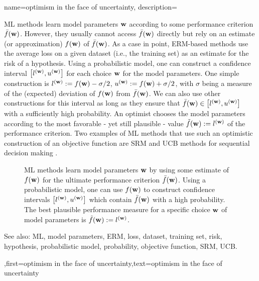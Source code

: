 {name={optimism in the face of uncertainty},
	description={ML methods learn model parameters ${\bf w}$ 
		according to some performance criterion $\bar{f}({\bf w})$. However, they usually 
		cannot access $\bar{f}({\bf w})$ directly but rely on an estimate (or approximation) 
		$f({\bf w})$ of $\bar{f}({\bf w})$. As a case in point, ERM-based methods use 
		the average loss on a given dataset (i.e., the training set) as an estimate 
		for the risk of a hypothesis. Using a probabilistic model, one can construct 
		a confidence interval 
	$\big[ l^{({\bf w})},  u^{({\bf w})} \big]$ for each choice ${\bf w}$ for the model parameters.
		One simple construction is $l^{({\bf w})} := f({\bf w}) - \sigma/2$, $u^{({\bf w})} := f({\bf w})+ \sigma/2$, 
	    with $\sigma$ being a measure of the (expected) deviation of $f({\bf w})$ from $\bar{f}({\bf w})$.
	We can also use other constructions for this interval as long as they ensure that $\bar{f}({\bf w}) \in\big[ l^{({\bf w})},  u^{({\bf w})} \big]$ 
	with a sufficiently high probability. An optimist chooses the model parameters 
	according to the most favorable - yet still plausible - value $\tilde{f}({\bf w}) :=  l^{({\bf w})}$ 
	of the performance criterion. Two examples of ML methods that use such an optimistic 
	construction of an objective function are SRM \cite[Ch. 11]{ShalevMLBook} and UCB methods 
	for sequential decision making \cite[Sec. 2.2]{Bubeck2012}. 
		\begin{figure}[H]
				\begin{center}
\caption{ML methods learn model parameters ${\bf w}$ by using some estimate of $f({\bf w})$ for 
	the ultimate performance criterion $\bar{f}({\bf w})$. Using a probabilistic model, one can use $f({\bf w})$ to 
	construct confidence intervals $\big[ l^{({\bf w})},  u^{({\bf w})} \big]$ which contain $\bar{f}({\bf w})$  
	with a high probability. The best plausible performance measure for a specific choice ${\bf w}$ of model parameters 
	is $\tilde{f}({\bf w}) := l^{({\bf w})}$.} 
	\end{center}
		\end{figure}
		See also: ML, model parameters, ERM, loss, dataset, training set, risk, hypothesis, probabilistic model, probability, objective function, SRM, UCB.},first={optimism in the face of uncertainty},text={optimism in the face of uncertainty} 
}

